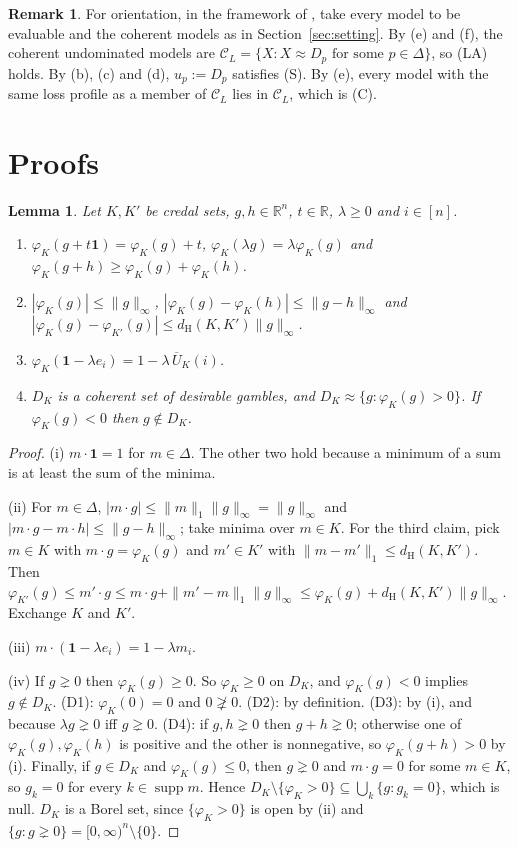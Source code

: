 \documentclass[11pt]{article}
\newtheorem{lemma}[theorem]{Lemma}
\theoremstyle{definition}
\newtheorem{remark}[theorem]{Remark}
\newcommand{\R}{\mathbb R}
\newcommand{\one}{\mathbf 1}
\newcommand{\supp}{\operatorname{supp}}
\newcommand{\dH}{d_{\mathrm H}}
\newcommand{\Ub}{\overline U}
\begin{document}
\begin{remark}\label{rem:axioms}
For orientation, in the framework of \cite{KCM}, take every model to be evaluable and the coherent models as in Section~\ref{sec:setting}. By (e) and (f), the coherent undominated models are $\mathcal C_L=\{X:X\approx D_p\text{ for some }p\in\Delta\}$, so (LA) holds. By (b), (c) and (d), $u_p:=D_p$ satisfies (S). By (e), every model with the same loss profile as a member of $\mathcal C_L$ lies in $\mathcal C_L$, which is (C).
\end{remark}

\section{Proofs}\label{sec:proofs}

\begin{lemma}\label{lem:basic}
Let $K,K'$ be credal sets, $g,h\in\R^n$, $t\in\R$, $\lambda\ge 0$ and $i\in[n]$.
\begin{enumerate}[label=(\roman*)]
\item $\varphi_K(g+t\one)=\varphi_K(g)+t$, $\varphi_K(\lambda g)=\lambda\varphi_K(g)$ and $\varphi_K(g+h)\ge\varphi_K(g)+\varphi_K(h)$.
\item $|\varphi_K(g)|\le\|g\|_\infty$, $|\varphi_K(g)-\varphi_K(h)|\le\|g-h\|_\infty$ and $|\varphi_K(g)-\varphi_{K'}(g)|\le\dH(K,K')\|g\|_\infty$.
\item $\varphi_K(\one-\lambda e_i)=1-\lambda\,\Ub_K(i)$.
\item $D_K$ is a coherent set of desirable gambles, and $D_K\approx\{g:\varphi_K(g)>0\}$. If $\varphi_K(g)<0$ then $g\notin D_K$.
\end{enumerate}
\end{lemma}

\begin{proof}
(i) $m\cdot\one=1$ for $m\in\Delta$. The other two hold because a minimum of a sum is at least the sum of the minima.

(ii) For $m\in\Delta$, $|m\cdot g|\le\|m\|_1\|g\|_\infty=\|g\|_\infty$ and $|m\cdot g-m\cdot h|\le\|g-h\|_\infty$; take minima over $m\in K$. For the third claim, pick $m\in K$ with $m\cdot g=\varphi_K(g)$ and $m'\in K'$ with $\|m-m'\|_1\le\dH(K,K')$. Then $\varphi_{K'}(g)\le m'\cdot g\le m\cdot g+\|m'-m\|_1\|g\|_\infty\le\varphi_K(g)+\dH(K,K')\|g\|_\infty$. Exchange $K$ and $K'$.

(iii) $m\cdot(\one-\lambda e_i)=1-\lambda m_i$.

(iv) If $g\gneq 0$ then $\varphi_K(g)\ge 0$. So $\varphi_K\ge 0$ on $D_K$, and $\varphi_K(g)<0$ implies $g\notin D_K$. (D1): $\varphi_K(0)=0$ and $0\not\gneq 0$. (D2): by definition. (D3): by (i), and because $\lambda g\gneq0$ iff $g\gneq0$. (D4): if $g,h\gneq 0$ then $g+h\gneq 0$; otherwise one of $\varphi_K(g),\varphi_K(h)$ is positive and the other is nonnegative, so $\varphi_K(g+h)>0$ by (i). Finally, if $g\in D_K$ and $\varphi_K(g)\le 0$, then $g\gneq 0$ and $m\cdot g=0$ for some $m\in K$, so $g_k=0$ for every $k\in\supp m$. Hence $D_K\setminus\{\varphi_K>0\}\subseteq\bigcup_k\{g:g_k=0\}$, which is null. $D_K$ is a Borel set, since $\{\varphi_K>0\}$ is open by (ii) and $\{g:g\gneq0\}=[0,\infty)^n\setminus\{0\}$.
\end{proof}
\end{document}
